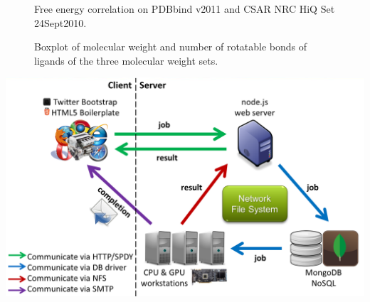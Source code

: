 \documentclass[12pt]{article}
\begin{document}
\begin{figure}
\caption{\label{FECorrelation} Free energy correlation on PDBbind v2011 and CSAR NRC HiQ Set 24Sept2010.}
\end{figure}

\begin{figure}
\caption{\label{MWT-NRB} Boxplot of molecular weight and number of rotatable bonds of ligands of the three molecular weight sets.}
\end{figure}





\clearpage

\begin{center}
\includegraphics[width=\linewidth,keepaspectratio=true]{Architecture.png}
\end{center}

\clearpage
\end{document}
